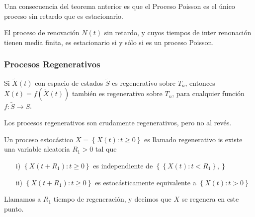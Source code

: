 \begin{Note}
Una consecuencia del teorema anterior es que el Proceso Poisson es el \'unico proceso sin retardo que es estacionario.
\end{Note}

\begin{Coro}
El proceso de renovaci\'on $N\left(t\right)$ sin retardo, y cuyos tiempos de inter renonaci\'on tienen media finita, es estacionario si y s\'olo si es un proceso Poisson.

\end{Coro}


\subsubsection{Procesos Regenerativos}



\begin{Note}
Si $\tilde{X}\left(t\right)$ con espacio de estados $\tilde{S}$ es regenerativo sobre $T_{n}$, entonces $X\left(t\right)=f\left(\tilde{X}\left(t\right)\right)$ tambi\'en es regenerativo sobre $T_{n}$, para cualquier funci\'on $f:\tilde{S}\rightarrow S$.
\end{Note}

\begin{Note}
Los procesos regenerativos son crudamente regenerativos, pero no al rev\'es.
\end{Note}
\begin{Def}
Un proceso estoc\'astico $X=\left\{X\left(t\right):t\geq0\right\}$ es llamado regenerativo is existe una variable aleatoria $R_{1}>0$ tal que
\begin{itemize}
\item[i)] $\left\{X\left(t+R_{1}\right):t\geq0\right\}$ es independiente de $\left\{\left\{X\left(t\right):t<R_{1}\right\},\right\}$
\item[ii)] $\left\{X\left(t+R_{1}\right):t\geq0\right\}$ es estoc\'asticamente equivalente a $\left\{X\left(t\right):t>0\right\}$
\end{itemize}

Llamamos a $R_{1}$ tiempo de regeneraci\'on, y decimos que $X$ se regenera en este punto.
\end{Def}


